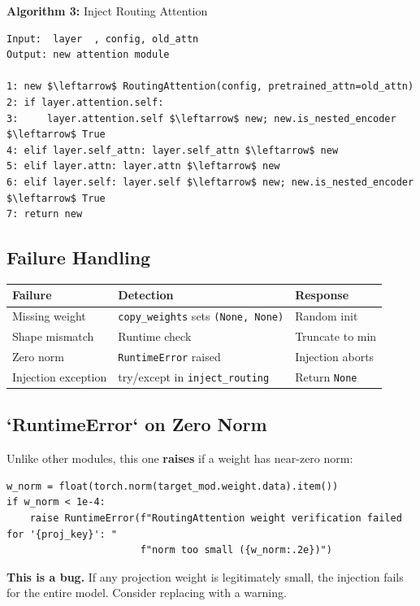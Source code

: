 \textbf{Algorithm 3:} Inject Routing Attention
\begin{lstlisting}
Input:  layer  , config, old_attn
Output: new attention module

1: new $\leftarrow$ RoutingAttention(config, pretrained_attn=old_attn)
2: if layer.attention.self: 
3:     layer.attention.self $\leftarrow$ new; new.is_nested_encoder $\leftarrow$ True
4: elif layer.self_attn: layer.self_attn $\leftarrow$ new
5: elif layer.attn: layer.attn $\leftarrow$ new
6: elif layer.self: layer.self $\leftarrow$ new; new.is_nested_encoder $\leftarrow$ True
7: return new
\end{lstlisting}

\subsection{Failure Handling}

\begin{table}[H]
\centering
\small
\begin{tabular}{lll}
\toprule
\textbf{Failure} & \textbf{Detection} & \textbf{Response} \\
\midrule
Missing weight & \texttt{copy\_weights} sets \texttt{(None, None)} & Random init \\
Shape mismatch & Runtime check & Truncate to min \\
Zero norm & \texttt{RuntimeError} raised & Injection aborts \\
Injection exception & try/except in \texttt{inject\_routing} & Return \texttt{None} \\
\bottomrule
\end{tabular}
\end{table}

\subsection{`RuntimeError` on Zero Norm}

Unlike other modules, this one \textbf{raises} if a weight has near-zero norm:

\begin{lstlisting}
w_norm = float(torch.norm(target_mod.weight.data).item())
if w_norm < 1e-4:
    raise RuntimeError(f"RoutingAttention weight verification failed for '{proj_key}': "
                       f"norm too small ({w_norm:.2e})")
\end{lstlisting}

\textbf{This is a bug.} If any projection weight is legitimately small, the 
injection fails for the entire model. Consider replacing with a warning.

